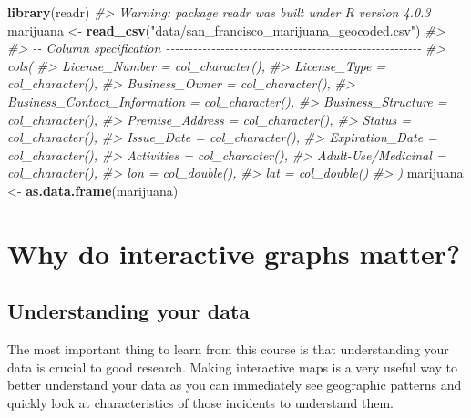 \documentclass[
  12pt,
]{book}
\newenvironment{Shaded}{\begin{snugshade}}{\end{snugshade}}
\newcommand{\CommentTok}[1]{\textcolor[rgb]{0.37,0.37,0.37}{\textit{#1}}}
\newcommand{\KeywordTok}[1]{\textcolor[rgb]{0.27,0.27,0.27}{\textbf{#1}}}
\newcommand{\NormalTok}[1]{#1}
\newcommand{\StringTok}[1]{\textcolor[rgb]{0.5,0.5,0.5}{#1}}
\begin{document}
\begin{Shaded}
\begin{Highlighting}[]
\KeywordTok{library}\NormalTok{(readr)}
\CommentTok{\#\textgreater{} Warning: package \textquotesingle{}readr\textquotesingle{} was built under R version 4.0.3}
\NormalTok{marijuana \textless{}{-}}\StringTok{ }\KeywordTok{read\_csv}\NormalTok{(}\StringTok{"data/san\_francisco\_marijuana\_geocoded.csv"}\NormalTok{)}
\CommentTok{\#\textgreater{} }
\CommentTok{\#\textgreater{} {-}{-} Column specification {-}{-}{-}{-}{-}{-}{-}{-}{-}{-}{-}{-}{-}{-}{-}{-}{-}{-}{-}{-}{-}{-}{-}{-}{-}{-}{-}{-}{-}{-}{-}{-}{-}{-}{-}{-}{-}{-}{-}{-}{-}{-}{-}{-}{-}{-}{-}{-}{-}{-}{-}{-}{-}{-}{-}{-}}
\CommentTok{\#\textgreater{} cols(}
\CommentTok{\#\textgreater{}   License\_Number = col\_character(),}
\CommentTok{\#\textgreater{}   License\_Type = col\_character(),}
\CommentTok{\#\textgreater{}   Business\_Owner = col\_character(),}
\CommentTok{\#\textgreater{}   Business\_Contact\_Information = col\_character(),}
\CommentTok{\#\textgreater{}   Business\_Structure = col\_character(),}
\CommentTok{\#\textgreater{}   Premise\_Address = col\_character(),}
\CommentTok{\#\textgreater{}   Status = col\_character(),}
\CommentTok{\#\textgreater{}   Issue\_Date = col\_character(),}
\CommentTok{\#\textgreater{}   Expiration\_Date = col\_character(),}
\CommentTok{\#\textgreater{}   Activities = col\_character(),}
\CommentTok{\#\textgreater{}   \textasciigrave{}Adult{-}Use/Medicinal\textasciigrave{} = col\_character(),}
\CommentTok{\#\textgreater{}   lon = col\_double(),}
\CommentTok{\#\textgreater{}   lat = col\_double()}
\CommentTok{\#\textgreater{} )}
\NormalTok{marijuana \textless{}{-}}\StringTok{ }\KeywordTok{as.data.frame}\NormalTok{(marijuana)}
\end{Highlighting}
\end{Shaded}

\hypertarget{why-do-interactive-graphs-matter}{%
\section{Why do interactive graphs matter?}\label{why-do-interactive-graphs-matter}}

\hypertarget{understanding-your-data}{%
\subsection{Understanding your data}\label{understanding-your-data}}

The most important thing to learn from this course is that understanding your data is crucial to good research. Making interactive maps is a very useful way to better understand your data as you can immediately see geographic patterns and quickly look at characteristics of those incidents to understand them.
\end{document}
